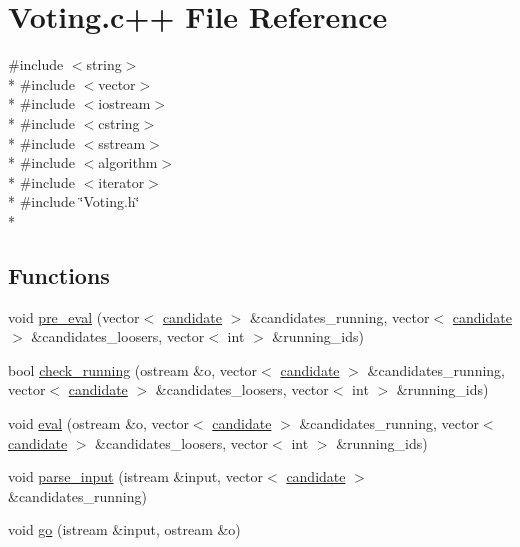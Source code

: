 \hypertarget{Voting_8c_09_09}{\section{Voting.\-c++ File Reference}
\label{Voting_8c_09_09}
}
{\ttfamily \#include $<$string$>$}\\*
{\ttfamily \#include $<$vector$>$}\\*
{\ttfamily \#include $<$iostream$>$}\\*
{\ttfamily \#include $<$cstring$>$}\\*
{\ttfamily \#include $<$sstream$>$}\\*
{\ttfamily \#include $<$algorithm$>$}\\*
{\ttfamily \#include $<$iterator$>$}\\*
{\ttfamily \#include \char`\"{}Voting.\-h\char`\"{}}\\*
\subsection*{Functions}
\begin{DoxyCompactItemize}
\item 
void \hyperlink{Voting_8c_09_09_ad3557df59291f9a79935ad6284397d05}{pre\-\_\-eval} (vector$<$ \hyperlink{classcandidate}{candidate} $>$ \&candidates\-\_\-running, vector$<$ \hyperlink{classcandidate}{candidate} $>$ \&candidates\-\_\-loosers, vector$<$ int $>$ \&running\-\_\-ids)
\item 
bool \hyperlink{Voting_8c_09_09_ac5bbf3572b2cefae84ab149299341770}{check\-\_\-running} (ostream \&o, vector$<$ \hyperlink{classcandidate}{candidate} $>$ \&candidates\-\_\-running, vector$<$ \hyperlink{classcandidate}{candidate} $>$ \&candidates\-\_\-loosers, vector$<$ int $>$ \&running\-\_\-ids)
\item 
void \hyperlink{Voting_8c_09_09_a96020138d7a719504acef5a7c227c337}{eval} (ostream \&o, vector$<$ \hyperlink{classcandidate}{candidate} $>$ \&candidates\-\_\-running, vector$<$ \hyperlink{classcandidate}{candidate} $>$ \&candidates\-\_\-loosers, vector$<$ int $>$ \&running\-\_\-ids)
\item 
void \hyperlink{Voting_8c_09_09_a0de3afd15c6b7ea2a12b3455b224f56e}{parse\-\_\-input} (istream \&input, vector$<$ \hyperlink{classcandidate}{candidate} $>$ \&candidates\-\_\-running)
\item 
void \hyperlink{Voting_8c_09_09_a909712a187183d0648ea5902f8bd6a1f}{go} (istream \&input, ostream \&o)
\end{DoxyCompactItemize}
